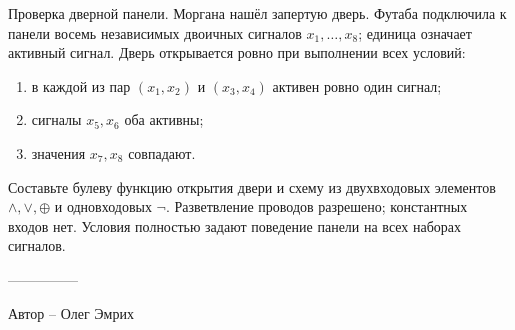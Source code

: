 \question
Проверка дверной панели. Моргана нашёл запертую дверь. Футаба подключила к панели восемь независимых двоичных сигналов $x_1,\ldots,x_8$; единица означает активный сигнал. Дверь открывается ровно при выполнении всех условий:
\begin{enumerate}
\item в каждой из пар $(x_1,x_2)$ и $(x_3,x_4)$ активен ровно один сигнал;
\item сигналы $x_5,x_6$ оба активны;
\item значения $x_7,x_8$ совпадают.
\end{enumerate}
Составьте булеву функцию открытия двери и схему из двухвходовых элементов $\land,\lor,\oplus$ и одновходовых $\neg$. Разветвление проводов разрешено; константных входов нет. Условия полностью задают поведение панели на всех наборах сигналов.

---------------

Автор -- Олег Эмрих
